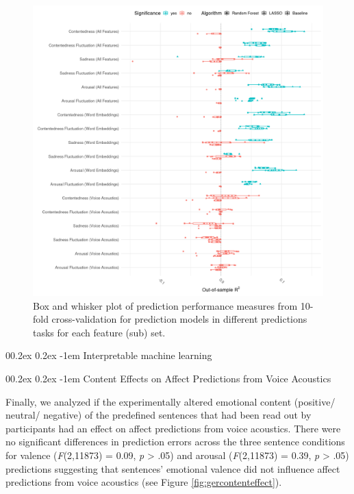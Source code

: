 \documentclass[
  man,floatsintext]{apa6}
\makeatletter
\let\oldparagraph\paragraph
\renewcommand{\paragraph}[1]{\oldparagraph{#1}\mbox{}}
\renewcommand{\paragraph}{\@startsection{paragraph}{4}{\parindent}%
  {0\baselineskip \@plus 0.2ex \@minus 0.2ex}%
  {-1em}%
  {\normalfont\normalsize\bfseries\itshape\typesectitle}}
\makeatother
\begin{document}
\begin{figure}

{\centering \includegraphics[width=1\linewidth,height=0.9\textheight]{../figures/bmr_us_egemaps_wordembeddings_plot} 

}

\caption[Prediction performance Study 2]{Box and whisker plot of prediction performance measures from 10-fold cross-validation for prediction models in different predictions tasks for each feature (sub) set.}\label{fig:uspredictionoverview}
\end{figure}

\hypertarget{interpretable-machine-learning}{%
\paragraph{Interpretable machine learning}\label{interpretable-machine-learning}}

\hypertarget{content-effects-on-affect-predictions-from-voice-acoustics}{%
\paragraph{Content Effects on Affect Predictions from Voice Acoustics}\label{content-effects-on-affect-predictions-from-voice-acoustics}}

Finally, we analyzed if the experimentally altered emotional content (positive/ neutral/ negative) of the predefined sentences that had been read out by participants had an effect on affect predictions from voice acoustics. There were no significant differences in prediction errors across the three sentence conditions for valence (\emph{F}(2,11873) = 0.09,
\emph{p} \textgreater{} .05) and arousal (\emph{F}(2,11873) = 0.39,
\emph{p} \textgreater{} .05) predictions suggesting that sentences' emotional valence did not influence affect predictions from voice acoustics (see Figure \ref{fig:gercontenteffect}).
\end{document}

